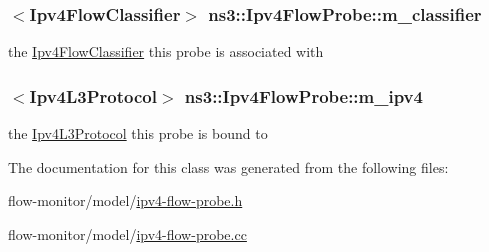 \subsubsection[{\texorpdfstring{m\+\_\+classifier}{m_classifier}}]{$<${\bf Ipv4\+Flow\+Classifier}$>$ ns3\+::\+Ipv4\+Flow\+Probe\+::m\+\_\+classifier\hspace{0.3cm}{\ttfamily [private]}}\hypertarget{classns3_1_1Ipv4FlowProbe_ae4e260f1b2fa6cacbab3f6fec914172e}{}\label{classns3_1_1Ipv4FlowProbe_ae4e260f1b2fa6cacbab3f6fec914172e}


the \hyperlink{classns3_1_1Ipv4FlowClassifier}{Ipv4\+Flow\+Classifier} this probe is associated with 

\subsubsection[{\texorpdfstring{m\+\_\+ipv4}{m_ipv4}}]{$<${\bf Ipv4\+L3\+Protocol}$>$ ns3\+::\+Ipv4\+Flow\+Probe\+::m\+\_\+ipv4\hspace{0.3cm}{\ttfamily [private]}}\hypertarget{classns3_1_1Ipv4FlowProbe_a8902eb4356b3e4a0f91b9031f80c8802}{}\label{classns3_1_1Ipv4FlowProbe_a8902eb4356b3e4a0f91b9031f80c8802}


the \hyperlink{classns3_1_1Ipv4L3Protocol}{Ipv4\+L3\+Protocol} this probe is bound to 



The documentation for this class was generated from the following files\+:\begin{DoxyCompactItemize}
\item 
flow-\/monitor/model/\hyperlink{ipv4-flow-probe_8h}{ipv4-\/flow-\/probe.\+h}\item 
flow-\/monitor/model/\hyperlink{ipv4-flow-probe_8cc}{ipv4-\/flow-\/probe.\+cc}\end{DoxyCompactItemize}
